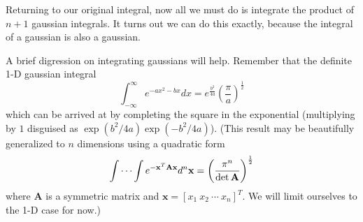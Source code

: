 \documentclass{amsart}
\newcommand{\mv}[1]{\mathbf{#1}}	%
\newcommand{\md}{d}		%
\begin{document}
Returning to our original integral, now all we must do is integrate the product of $n+1$ gaussian integrals.  It turns out we can do this exactly, because the integral of a gaussian is also a gaussian.

A brief digression on integrating gaussians will help.  Remember that the definite 1-D gaussian integral
\begin{equation*}
\int_{-\infty}^{\infty} e^{-ax^2-bx} \md x = e^{\frac{b^2}{4a}}\left(\frac{\pi}{a}\right)^{\frac{1}{2}}
\end{equation*}
which can be arrived at by completing the square in the exponential (multiplying by $1$ disguised as $\exp{(b^2/4a)}\exp{(-b^2/4a)}$).  (This result may be beautifully generalized to $n$ dimensions using a quadratic form
\begin{equation*}
\idotsint e^{-\mv{x}^T\mv{A}\mv{x}} \md^n \mv{x}= \left(\frac{\pi^n}{\det{\mv{A}}}\right)^{\frac{1}{2}}
\end{equation*}
where $\mv{A}$ is a symmetric matrix and $\mv{x}=[x_1 \ x_2 \ \cdots \ x_n]^T$.  We will limit ourselves to the 1-D case for now.)
\end{document}
